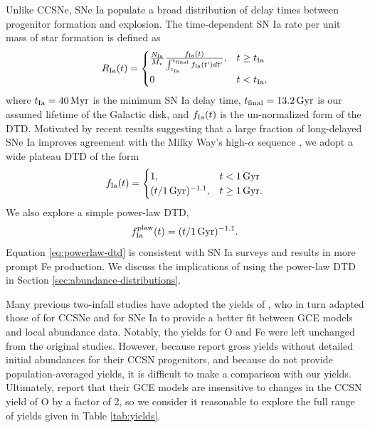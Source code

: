 \documentclass[twocolumn,twocolappendix,linenumbers]{aastex631}
\begin{document}
Unlike CCSNe, SNe Ia populate a broad distribution of delay times between progenitor formation and explosion. The time-dependent SN Ia rate per unit mass of star formation is defined as
\begin{equation}
    R_{\rm Ia}(t) = 
    \begin{cases}
        \frac{N_{\rm Ia}}{M_\star}
        \frac{f_{\rm Ia}(t)}{\int_{t_{\rm Ia}}^{t_{\rm final}} f_{\rm Ia}(t') dt'}, & t \ge t_{\rm Ia} \\
        0 & t < t_{\rm Ia},
    \end{cases}
    \label{eq:dtd-function}
\end{equation}
where $t_{\rm Ia}=40\,{\rm Myr}$ is the minimum SN Ia delay time, $t_{\rm final}=13.2\,{\rm Gyr}$ is our assumed lifetime of the Galactic disk, and $f_{\rm Ia}(t)$ is the un-normalized form of the DTD. Motivated by recent results suggesting that a large fraction of long-delayed SNe Ia improves agreement with the Milky Way's high-$\alpha$ sequence \citep{palicio_analytic_2023,dubay_galactic_2024}, we adopt a wide plateau DTD of the form
\begin{equation}
    \label{eq:plateau-dtd}
    f_{\rm Ia}(t) =
    \begin{cases}
        1, & t < 1\,{\rm Gyr} \\
        (t/1\,{\rm Gyr})^{-1.1}, & t \ge 1\,{\rm Gyr}.
    \end{cases}
\end{equation}
We also explore a simple power-law DTD,
\begin{equation}
    f_{\rm Ia}^{\rm plaw}(t) = (t/1\,\rm{Gyr})^{-1.1}.
    \label{eq:powerlaw-dtd}
\end{equation}
Equation \ref{eq:powerlaw-dtd} is consistent with SN Ia surveys \citep[e.g.,][]{maoz_star_2017} and results in more prompt Fe production.
We discuss the implications of using the power-law DTD in Section \ref{sec:abundance-distributions}.

Many previous two-infall studies have adopted the yields of \citet{francois_evolution_2004}, who in turn adapted those of \citet{woosley_evolution_1995} for CCSNe and \citet{iwamoto_nucleosynthesis_1999} for SNe Ia to provide a better fit between GCE models and local abundance data. Notably, the yields for O and Fe were left unchanged from the original studies. However, because \citet{woosley_evolution_1995} report gross yields without detailed initial abundances for their CCSN progenitors, and because \citet{francois_evolution_2004} do not provide population-averaged yields, it is difficult to make a comparison with our yields. Ultimately, \citet{francois_evolution_2004} report that their GCE models are insensitive to changes in the CCSN yield of O by a factor of 2, so we consider it reasonable to explore the full range of yields given in Table \ref{tab:yields}.
\end{document}
